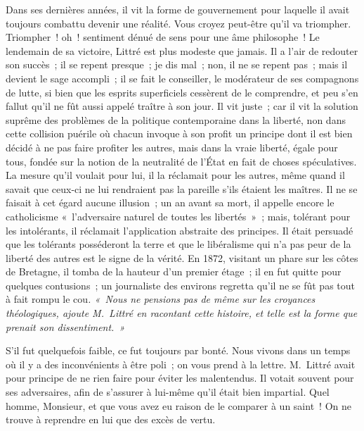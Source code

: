 \documentclass[french,twoside]{book} %
\newcommand\persName[1]{#1}
\newcommand\placeName[1]{#1}
\begin{document}
Dans ses dernières années, il vit la forme de gouvernement pour laquelle il avait toujours combattu devenir une réalité. Vous croyez peut-être qu’il va triompher. Triompher ! oh ! sentiment dénué de sens pour une âme philosophe ! Le lendemain de sa victoire, {\persName Littré} est plus modeste que jamais. Il a l’air de redouter son succès ; il se repent presque ; je dis mal ; non, il ne se repent pas ; mais il devient le sage accompli ; il se fait le conseiller, le modérateur de ses compagnons de lutte, si bien que les esprits superficiels cessèrent de le comprendre, et peu s’en fallut qu’il ne fût aussi appelé traître à son jour. Il vit juste ; car il vit la solution suprême des problèmes de la politique contemporaine dans la liberté, non dans cette collision puérile où chacun invoque à son profit un principe dont il est bien décidé à ne pas faire profiter les autres, mais dans la vraie liberté, égale pour tous, fondée sur la notion de la neutralité de l’État en fait de choses spéculatives. La mesure qu’il voulait pour lui, il la réclamait pour les autres, même quand il savait que ceux-ci ne lui rendraient pas la pareille s’ils étaient les maîtres. Il ne se faisait à cet égard aucune illusion ; un an avant sa mort, il appelle encore le catholicisme « l’adversaire naturel de toutes les libertés » ; mais, tolérant pour les intolérants, il réclamait l’application abstraite des principes. Il était persuadé que les tolérants posséderont la terre et que le libéralisme qui n’a pas peur de la liberté des autres est le signe de la vérité. En 1872, visitant un phare sur les côtes de {\placeName Bretagne}, il tomba de la hauteur d’un premier étage ; il en fut quitte pour quelques contusions ; un journaliste des environs regretta qu’il ne se fût pas tout à fait rompu le cou\emph{. « Nous ne pensions pas de même sur les croyances théologiques, ajoute {\persName M. Littré} en racontant cette histoire, et telle est la forme que prenait son dissentiment. »}\par
S’il fut quelquefois faible, ce fut toujours par bonté. Nous vivons dans un temps où il y a des inconvénients à être poli ; on vous prend à la lettre. {\persName M. Littré} avait pour principe de ne rien faire pour éviter les malentendus. Il votait souvent pour ses adversaires, afin de s’assurer à lui-même qu’il était bien impartial. Quel homme, Monsieur, et que vous avez eu raison de le comparer à un saint ! On ne trouve à reprendre en lui que des excès de vertu.\par
\end{document}
